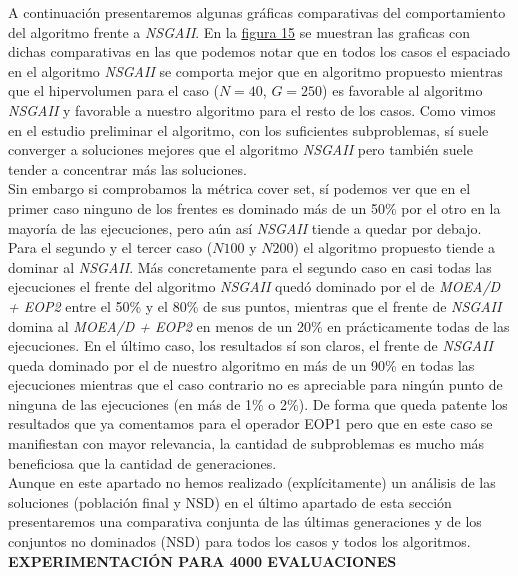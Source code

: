 A continuación presentaremos algunas gráficas comparativas del comportamiento del algoritmo frente a \textit{NSGAII}. En la \hyperref[fig:15]{figura 15} se muestran las graficas con dichas comparativas en las que podemos notar que en todos los casos el espaciado en el algoritmo \textit{NSGAII} se comporta mejor que en algoritmo propuesto mientras que el hipervolumen para el caso ($N=40$, $G=250$) es favorable al algoritmo \textit{NSGAII} y favorable a nuestro algoritmo para el resto de los casos. Como vimos en el estudio preliminar el algoritmo, con los suficientes subproblemas, sí suele converger a soluciones mejores que el algoritmo \textit{NSGAII} pero también suele tender a concentrar más las soluciones.\\

Sin embargo si comprobamos la métrica cover set, sí podemos ver que en el primer caso ninguno de los frentes es dominado más de un 50\% por el otro en la mayoría de las ejecuciones, pero aún así \textit{NSGAII} tiende a quedar por debajo. Para el segundo y el tercer caso ($N100$ y $N200$) el algoritmo propuesto tiende a dominar al \textit{NSGAII}. Más concretamente para el segundo caso en casi todas las ejecuciones el frente del algoritmo \textit{NSGAII} quedó dominado por el de \textit{MOEA/D + EOP2} entre el 50\% y el 80\% de sus puntos, mientras que el frente de  \textit{NSGAII} domina al \textit{MOEA/D + EOP2} en menos de un 20\% en prácticamente todas de las ejecuciones. En el último caso, los resultados sí son claros, el frente de \textit{NSGAII} queda dominado por el de nuestro algoritmo en más de un 90\% en todas las ejecuciones mientras que el caso contrario no es apreciable para ningún punto de ninguna de las ejecuciones (en más de 1\% o 2\%). De forma que queda patente los resultados que ya comentamos para el operador EOP1 pero que en este caso se manifiestan con mayor relevancia, la cantidad de subproblemas es mucho más beneficiosa que la cantidad de generaciones.\\

Aunque en este apartado no hemos realizado (explícitamente) un análisis de las soluciones (población final y NSD) en el último apartado de esta sección presentaremos una comparativa conjunta de las últimas generaciones y de los conjuntos no dominados (NSD) para todos los casos y todos los algoritmos.	\\

\noindent\textbf{EXPERIMENTACIÓN PARA 4000 EVALUACIONES}\\

